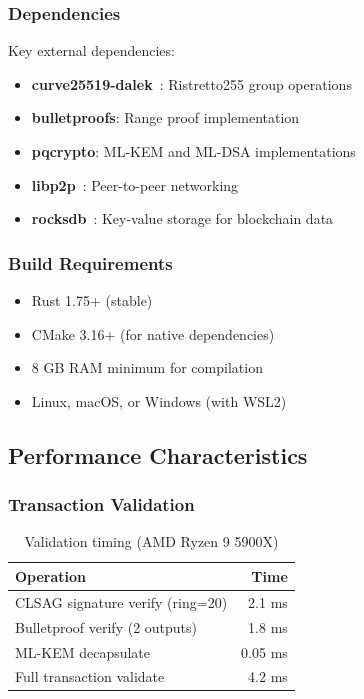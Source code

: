 \subsubsection{Dependencies}

Key external dependencies:

\begin{itemize}
  \item \textbf{curve25519-dalek}~\cite{dalek}: Ristretto255 group operations
  \item \textbf{bulletproofs}: Range proof implementation
  \item \textbf{pqcrypto}: ML-KEM and ML-DSA implementations
  \item \textbf{libp2p}~\cite{libp2p}: Peer-to-peer networking
  \item \textbf{rocksdb}~\cite{rocksdb}: Key-value storage for blockchain data
\end{itemize}

\subsubsection{Build Requirements}

\begin{itemize}
  \item Rust 1.75+ (stable)
  \item CMake 3.16+ (for native dependencies)
  \item 8 GB RAM minimum for compilation
  \item Linux, macOS, or Windows (with WSL2)
\end{itemize}

\subsection{Performance Characteristics}

\subsubsection{Transaction Validation}

\begin{table}[h]
\centering
\caption{Validation timing (AMD Ryzen 9 5900X)}
\label{tab:validation-timing}
\begin{tabular}{@{}lr@{}}
\toprule
\textbf{Operation} & \textbf{Time} \\
\midrule
CLSAG signature verify (ring=20) & 2.1 ms \\
Bulletproof verify (2 outputs) & 1.8 ms \\
ML-KEM decapsulate & 0.05 ms \\
Full transaction validate & 4.2 ms \\
\bottomrule
\end{tabular}
\end{table}

